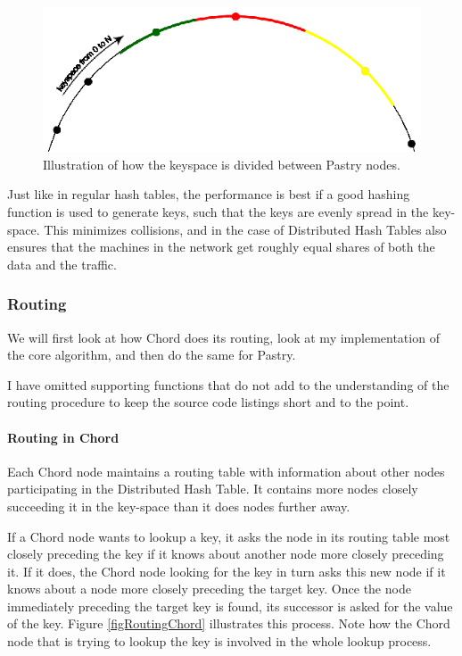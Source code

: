 \begin{figure}[!htb]
\begin{center}
	\includegraphics[width=0.9\linewidth]{illustrations/PastryKeySpace.eps}
  \caption{Illustration of how the keyspace is divided between Pastry nodes.}
  \label{figKeyspacePastry}
\end{center}
\end{figure}

Just like in regular hash tables, the performance is best if a good hashing function is used to generate keys, such that the keys are evenly spread in the key-space. This minimizes collisions, and in the case of Distributed Hash Tables also ensures that the machines in the network get roughly equal shares of both the data and the traffic.

\subsubsection{Routing}
We will first look at how Chord does its routing, look at my implementation of the core algorithm, and then do the same for Pastry.

I have omitted supporting functions that do not add to the understanding of the routing procedure to keep the source code listings short and to the point.


\paragraph{Routing in Chord}
Each Chord node maintains a routing table with information about other nodes participating in the Distributed Hash Table. It contains more nodes closely succeeding it in the key-space than it does nodes further away. 

If a Chord node wants to lookup a key, it asks the node in its routing table most closely preceding the key if it knows about another node more closely preceding it. If it does, the Chord node looking for the key in turn asks this new node if it knows about a node more closely preceding the target key. Once the node immediately preceding the target key is found, its successor is asked for the value of the key. Figure \ref{figRoutingChord} illustrates this process. Note how the Chord node that is trying to lookup the key is involved in the whole lookup process.

